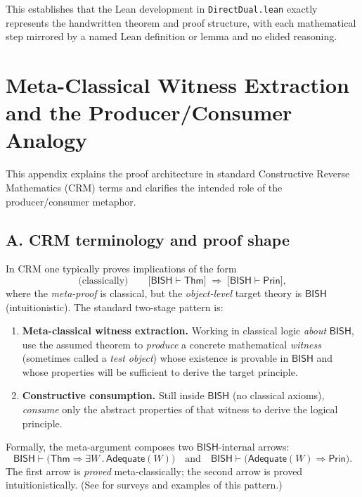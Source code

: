 \documentclass[11pt]{article}
\begin{document}
\medskip
This establishes that the Lean development in \texttt{DirectDual.lean} exactly represents the handwritten theorem and proof structure, with each mathematical step mirrored by a named Lean definition or lemma and no elided reasoning.

\appendix
\section{Meta-Classical Witness Extraction and the Producer/Consumer Analogy}
\label{app:MetaWitnessPC}

This appendix explains the proof architecture in standard Constructive Reverse Mathematics (CRM) terms and clarifies the intended role of the producer/consumer metaphor.

\subsection*{A. CRM terminology and proof shape}

In CRM one typically proves implications of the form
\[
\text{(classically)}\qquad \big[\mathsf{BISH} \vdash \mathsf{Thm}\big] \;\Longrightarrow\; \big[\mathsf{BISH} \vdash \mathsf{Prin}\big],
\]
where the \emph{meta-proof} is classical, but the \emph{object-level} target theory is $\mathsf{BISH}$ (intuitionistic). The standard two-stage pattern is:
\begin{enumerate}
\item \textbf{Meta-classical witness extraction.}
Working in classical logic \emph{about} $\mathsf{BISH}$, use the assumed theorem to \emph{produce} a concrete mathematical \emph{witness} (sometimes called a \emph{test object}) whose existence is provable in $\mathsf{BISH}$ and whose properties will be sufficient to derive the target principle.
\item \textbf{Constructive consumption.}
Still inside $\mathsf{BISH}$ (no classical axioms), \emph{consume} only the abstract properties of that witness to derive the logical principle.
\end{enumerate}

Formally, the meta-argument composes two $\mathsf{BISH}$-internal arrows:
\[
\mathsf{BISH} \vdash \big(\mathsf{Thm} \Rightarrow \exists W\,.\,\mathsf{Adequate}(W)\big)
\quad\text{and}\quad
\mathsf{BISH} \vdash \big(\mathsf{Adequate}(W)\Rightarrow \mathsf{Prin}\big).
\]
The first arrow is \emph{proved} meta-classically; the second arrow is proved intuitionistically. (See \cite{Ishihara06,DienerCRM,Ishihara90} for surveys and examples of this pattern.)
\end{document}

